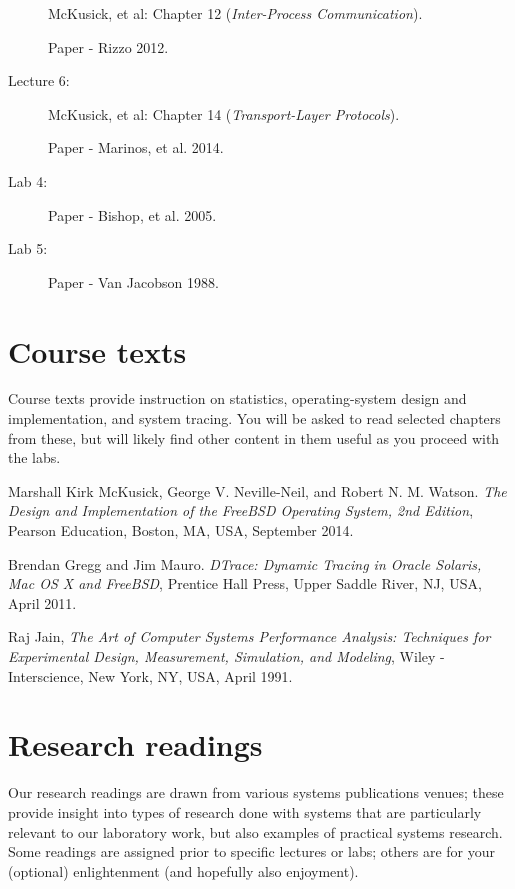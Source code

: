 \documentclass[a4paper,10pt]{article}
\begin{document}
\begin{description}
  McKusick, et al: Chapter 12 (\textit{Inter-Process Communication}).

  Paper - Rizzo 2012.

\item[Lecture 6:]

  McKusick, et al: Chapter 14 (\textit{Transport-Layer Protocols}).

  Paper - Marinos, et al. 2014.

\item[Lab 4:]

  Paper - Bishop, et al. 2005.

\item[Lab 5:]

  Paper - Van Jacobson 1988.
\end{description}

\section*{Course texts}
Course texts provide instruction on statistics, operating-system design and
implementation, and system tracing.
You will be asked to read selected chapters from these, but will likely find
other content in them useful as you proceed with the labs.

\medskip

\noindent
Marshall Kirk McKusick, George V. Neville-Neil, and Robert N. M. Watson.
\textit{The Design and Implementation of the FreeBSD Operating System, 2nd
Edition}, Pearson Education, Boston, MA, USA, September 2014.


\medskip
\noindent
Brendan Gregg and Jim Mauro. \textit{DTrace: Dynamic Tracing in Oracle
Solaris, Mac OS X and FreeBSD}, Prentice Hall Press, Upper Saddle River, NJ,
USA, April 2011.

\medskip
\noindent
Raj Jain, \textit{The Art of Computer Systems Performance Analysis: Techniques
for Experimental Design, Measurement, Simulation, and Modeling}, Wiley -
Interscience, New York, NY, USA, April 1991.

\section*{Research readings}

Our research readings are drawn from various systems publications venues;
these provide insight into types of research done with systems that are
particularly relevant to our laboratory work, but also examples of practical
systems research.
Some readings are assigned prior to specific lectures or labs; others are for
your (optional) enlightenment (and hopefully also enjoyment).
\end{document}
